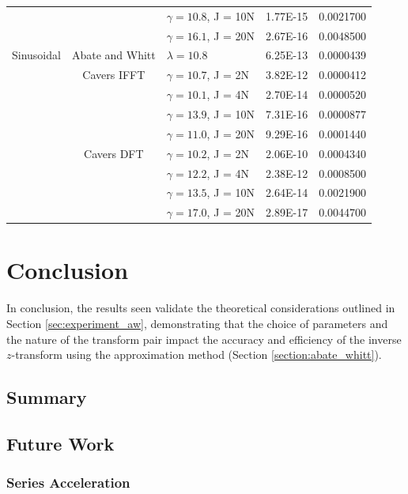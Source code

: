 \documentclass[a4paper]{report}
\begin{document}
\begin{longtable}{c|c|l|l|l}
    & & $\gamma = 10.8$, J = 10N & 1.77E-15 & 0.0021700 \\
    & & $\gamma = 16.1$, J = 20N & 2.67E-16 & 0.0048500 \\
    \hline
    Sinusoidal & Abate and Whitt & $\lambda = 10.8$ & 6.25E-13 & 0.0000439 \\
    & Cavers IFFT & $\gamma = 10.7$, J = 2N & 3.82E-12 & 0.0000412 \\
    & & $\gamma = 10.1$, J = 4N & 2.70E-14 & 0.0000520 \\
    & & $\gamma = 13.9$, J = 10N & 7.31E-16 & 0.0000877 \\
    & & $\gamma = 11.0$, J = 20N & 9.29E-16 & 0.0001440 \\
    & Cavers DFT & $\gamma = 10.2$, J = 2N & 2.06E-10 & 0.0004340 \\
    & & $\gamma = 12.2$, J = 4N & 2.38E-12 & 0.0008500 \\
    & & $\gamma = 13.5$, J = 10N & 2.64E-14 & 0.0021900 \\
    & & $\gamma = 17.0$, J = 20N & 2.89E-17 & 0.0044700 \\
\end{longtable}

\chapter{Conclusion}
In conclusion, the results seen validate the theoretical considerations outlined in Section \ref{sec:experiment_aw}, demonstrating that the choice of parameters and the nature of the transform pair impact the accuracy and efficiency of the inverse $z$-transform using the approximation method (Section \ref{section:abate_whitt}).

\section{Summary}

\section{Future Work}

\subsection{Series Acceleration}
\end{document}
